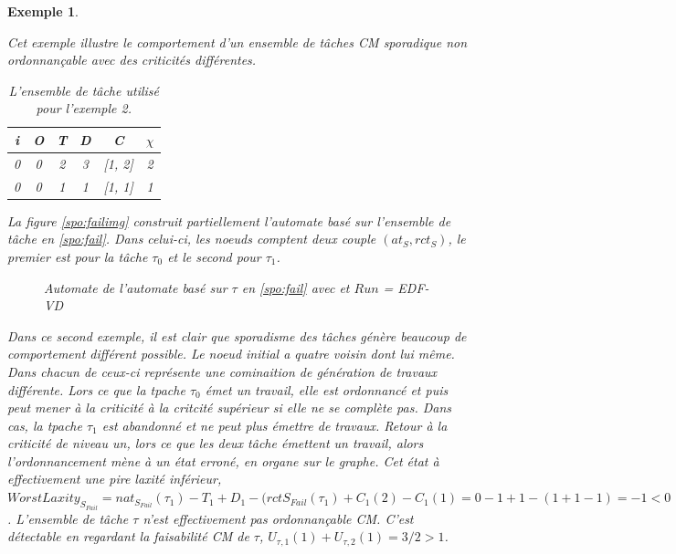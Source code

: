 \documentclass[12pt,a4paper,oneside]{book}
\theoremstyle{break}
\newtheorem{exem}{Exemple}[chapter]
\theoremstyle{breakplain}
\begin{document}
\begin{exem}
\label{spo:exem:fail}

Cet exemple illustre le comportement d'un ensemble de tâches CM sporadique non ordonnançable avec des criticités différentes.

\begin{table}[h]

    \centering

\begin{tabular}{|c|c|c|c|c|c|}
\hline
i &O & T & D & C & $\chi$\\
\hline
0 & 0 & 2 & 3 & [1, 2]& 2\\
\hline
0 & 0 & 1 & 1 & [1, 1]& 1\\
\hline
\end{tabular}
    
\caption{L'ensemble de tâche utilisé pour l'exemple 2.}
\label{spo:fail}

\end{table}

La figure \autoref{spo:failimg} construit partiellement l'automate basé sur l'ensemble de tâche en \autoref{spo:fail}. Dans celui-ci, les noeuds comptent deux couple $(at_S, rct_S)$, le premier est pour la tâche $\tau_0$ et le second pour $\tau_1$.

\begin{figure}[h]

    \centering
    \def\svgwidth{\columnwidth}
    
    
\caption{Automate de l'automate basé sur $\tau$ en \autoref{spo:fail} avec et $Run$ = EDF-VD}
\label{spo:failimg}

\end{figure}

Dans ce second exemple, il est clair que sporadisme des tâches génère beaucoup de comportement différent possible. Le noeud initial a quatre voisin dont lui même. Dans chacun de ceux-ci représente une cominaition de génération de travaux différente. Lors ce que la tpache $\tau_0$ émet un travail, elle est ordonnancé et puis peut mener à la criticité à la critcité supérieur si elle ne se complète pas. Dans cas, la tpache $\tau_1$ est abandonné et ne peut plus émettre de travaux. Retour à la criticité de niveau un, lors ce que les deux tâche émettent un travail, alors l'ordonnancement mène à un état erroné, en organe sur le graphe. Cet état à effectivement une pire laxité inférieur, $WorstLaxity_{S_{Fail}} = nat_{S_{Fail}}(\tau_1)-T_1+D_1-(rct{S_{Fail}}(\tau_1) +C_1(2) - C_1(1) = 0 -1+1 -(1 +1 -1) = -1 <0$. L'ensemble de tâche $\tau$ n'est effectivement pas ordonnançable CM. C'est détectable en regardant la faisabilité CM de $\tau$, $U_{\tau, 1}(1) + U_{\tau, 2}(1)= 3/2 >1$.

\end{exem}
\end{document}
